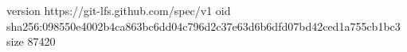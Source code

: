 version https://git-lfs.github.com/spec/v1
oid sha256:098550e4002b4ca863bc6dd04c796d2c37e63d6b6dfd07bd42ced1a755cb1bc3
size 87420
